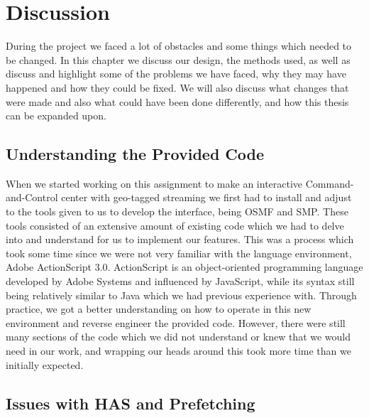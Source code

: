 \chapter{Discussion}
\label{cha:discussion}


During the project we faced a lot of obstacles and some things which needed to be changed. In this chapter we discuss our design, the methods used, as well as discuss and highlight some of the problems we have faced, why they may have happened and how they could be fixed. We will also discuss what changes that were made and also what could have been done differently, and how this thesis can be expanded upon.


\section{Understanding the Provided Code}
\label{sec:understandingcode}

When we started working on this assignment to make an interactive Command-and-Control center with geo-tagged streaming we first had to install and adjust to the tools given to us to develop the interface, being OSMF and SMP. These tools consisted of an extensive amount of existing code which we had to delve into and understand for us to implement our features.
This was a process which took some time since we were not very familiar with the language environment, Adobe ActionScript 3.0. ActionScript is an object-oriented programming language developed by Adobe Systems and influenced by JavaScript, while its syntax still being relatively similar to Java which we had previous experience with. Through practice, we got a better understanding on how to operate in this new environment and reverse engineer the provided code. However, there were still many sections of the code which we did not understand or knew that we would need in our work, and wrapping our heads around this took more time than we initially expected. 

\section{Issues with HAS and Prefetching}
\label{sec:hasissues}

